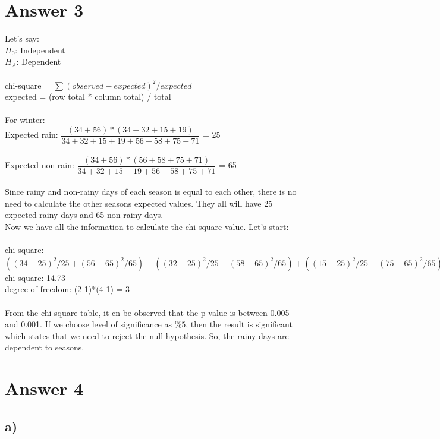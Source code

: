 \documentclass[12pt]{article}
\begin{document}
\section*{Answer 3}
Let's say:\\
$H_0$: Independent\\
$H_A$: Dependent\\
\\
chi-square = $\sum (observed - expected)^2 / expected$\\
expected = (row total * column total) / total\\
\\
For winter:\\
Expected rain: $\dfrac{(34+56)*(34+32+15+19)}{34+32+15+19+56+58+75+71}$ = 25\\
\\
Expected non-rain: $\dfrac{(34+56)*(56+58+75+71)}{34+32+15+19+56+58+75+71}$ = 65\\  
\\
Since rainy and non-rainy days of each season is equal to each other, there is no need to calculate the other seasons expected values. They all will have 25 expected rainy days and 65 non-rainy days.\\
Now we have all the information to calculate the chi-square value. Let's start:\\
\\
chi-square: $((34-25)^2 / 25 + (56-65)^2 / 65) + ((32-25)^2 / 25 + (58-65)^2 / 65) + ((15-25)^2 / 25 + (75-65)^2 / 65) + ((19-25)^2 / 25 + (71-65)^2 / 65)$
\\
chi-square: 14.73\\
degree of freedom: (2-1)*(4-1) = 3\\
\\
From the chi-square table, it cn be observed that the p-value is between 0.005 and 0.001. If we choose level of significance as $\% 5$, then the result is significant which states that we need to reject the null hypothesis. So, the rainy days are dependent to seasons.\\ 
\section*{Answer 4}

\subsection*{a)} 
\end{document}
